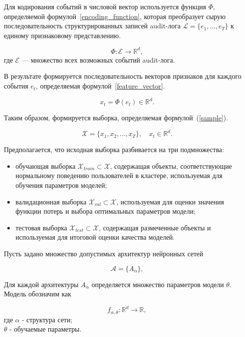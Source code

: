 Для кодирования событий в числовой вектор используется функция $\Phi$, определяемой формулой~\eqref{encoding_function}, которая преобразует сырую последовательность структурированных записей audit-лога $\mathcal{L} = \{e_1, \dots, e_T\}$ к единому признаковому представлению.

\begin{equation}\label{encoding_function}
    \Phi : \mathcal{E} \rightarrow \mathbb{R}^d,
\end{equation}
где $\mathcal{E}$ — множество всех возможных событий audit-лога. 

В результате формируется последовательность векторов признаков для каждого события $e_t$, определяемая формулой~\eqref{feature_vector}.

\begin{equation}\label{feature_vector}
    x_t = \Phi(e_t) \in \mathbb{R}^d.
\end{equation}

Таким образом, формируется выборка, определяемая формулой~(\ref{sample}).

\begin{equation}\label{sample}
    \mathcal{X} = \{ x_1, x_2, \dots, x_T \}, \quad x_t \in \mathbb{R}^d.
\end{equation}

Предполагается, что исходная выборка разбивается на три подмножества:

\begin{itemize}
    \item обучающая выборка $\mathcal{X}_{train} \subset \mathcal{X}$, содержащая объекты, соответствующие нормальному поведению пользователей в кластере, используемая для обучения параметров моделей;
    \item валидационная выборка $\mathcal{X}_{val} \subset \mathcal{X}$, используемая для оценки значения функции потерь и выбора оптимальных параметров модели;
    \item тестовая выборка $\mathcal{X}_{test} \subset \mathcal{X}$, содержащая размеченные объекты и используемая для итоговой оценки качества моделей.
\end{itemize}

Пусть задано множество допустимых архитектур нейронных сетей

$$\mathcal{A} = \{ A_\alpha \},$$

Для каждой архитектуры $A_\alpha$ определяется множество параметров модели $\theta$. Модель обозначим как

$$f_{\alpha,\theta} : \mathbb{R}^d \rightarrow \mathbb{R},$$
где $\alpha$ - структура сети; \\ $\theta$ - обучаемые параметры.

